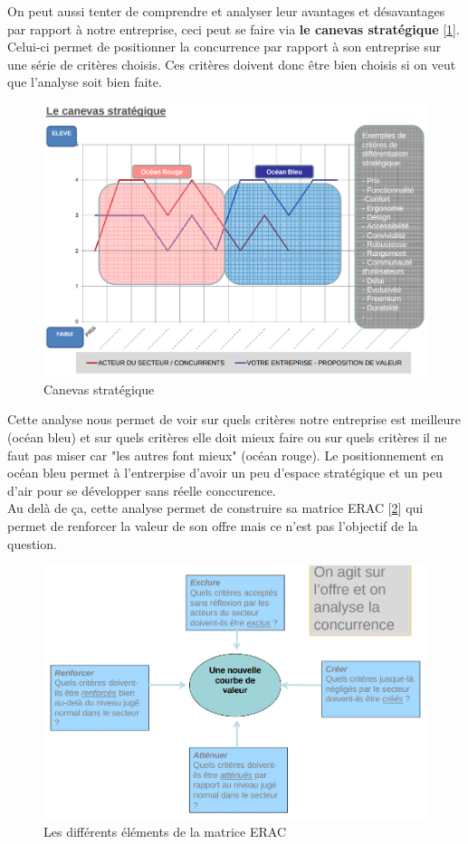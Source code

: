 \documentclass{article}
\begin{document}
On peut aussi tenter de comprendre et analyser leur avantages et désavantages par rapport à notre entreprise, ceci peut se faire via \textbf{le canevas stratégique} [\ref{fig:canevasStrategique}]. Celui-ci permet de positionner la concurrence par rapport à son entreprise sur une série de critères choisis. Ces critères doivent donc être bien choisis si on veut que l'analyse soit bien faite.
\begin{figure}[H]
	\centering
	\includegraphics[width=12cm]{canevasStrategique.png}
	\caption{Canevas stratégique}
	\label{fig:canevasStrategique}
\end{figure}

Cette analyse nous permet de voir sur quels critères notre entreprise est meilleure (océan bleu) et sur quels critères elle doit mieux faire ou sur quels critères il ne faut pas miser car "les autres font mieux" (océan rouge). Le positionnement en océan bleu permet à l'entrerpise d'avoir un peu d'espace stratégique et un peu d'air pour se développer sans réelle conccurence.\\

Au delà de ça, cette analyse permet de construire sa matrice ERAC [\ref{fig:ERAC}] qui permet de renforcer la valeur de son offre mais ce n'est pas l'objectif de la question.
\begin{figure}[H]
	\centering
	\includegraphics[width=14cm]{ERAC.png}
	\caption{Les différents éléments de la matrice ERAC}
	\label{fig:ERAC}
\end{figure}
\end{document}
